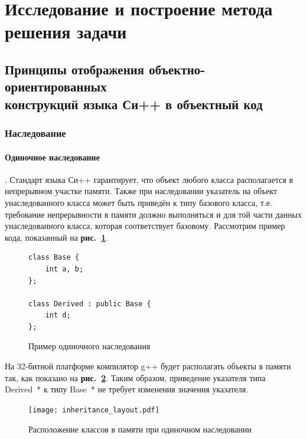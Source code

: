 \documentclass[a4paper,12pt,russian]{article}
\newcommand{\picref}[1]{\textbf{рис.~\ref{#1}}}
\newcommand{\code}[1]{\textsf{#1}}
\begin{document}
\newpage
\section{Исследование и построение метода решения задачи}
\subsection{Принципы отображения объектно-ориентированных \\конструкций языка Си++ в объектный код}
\subsubsection{Наследование}
\paragraph{Одиночное наследование}.
Стандарт языка Си++ \cite{cpp_standard} гарантирует, что объект любого класса располагается в непрерывном участке памяти.
Также при наследовании указатель на объект унаследованного класса может быть приведён к типу базового класса, т.е. требование непрерывности в памяти должно выполняться и для той части данных унаследованного класса, которая соответствует базовому.
Рассмотрим пример кода, показанный на \picref{single_inheritance_lst}.
\begin{figure}[b]
\begin{lstlisting}
class Base {
    int a, b;
};

class Derived : public Base {
    int d;
};
\end{lstlisting}
\caption{Пример одиночного наследования}
\label{single_inheritance_lst}
\end{figure}
На 32-битной платформе компилятор g++ будет располагать объекты в памяти так, как показано на \picref{inheritance_layout_fig}. Таким образом, приведение указателя типа \code{Derived~*} к типу \code{Base~*} не требует изменения значения указателя.
\begin{figure}[b]
  \center
  \texttt{[image: inheritance\_layout.pdf]}
  \hfill
  \caption{Расположение классов в памяти при одиночном наследовании}
  \label{inheritance_layout_fig}
\end{figure}
\end{document}
